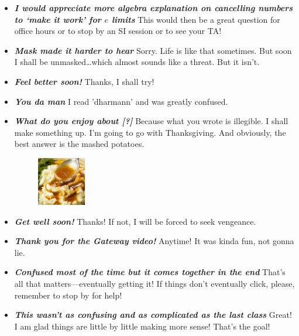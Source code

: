 \documentclass[11pt,letterpaper]{article}
\begin{document}
\begin{itemize}
\item {\bfseries\itshape I would appreciate more algebra explanation on cancelling numbers to `make it work' for $e$ limits} This would then be a great question for office hours or to stop by an SI session or to see your TA! 

\item {\bfseries\itshape Mask made it harder to hear} Sorry. Life is like that sometimes. But soon I shall be unmasked\dots which almost sounds like a threat. But it isn't. 

\item {\bfseries\itshape Feel better soon!} Thanks, I shall try!

\item {\bfseries\itshape You da man} I read 'dharmann' and was greatly confused. 

\item {\bfseries\itshape What do you enjoy about [?]} Because what you wrote is illegible. I shall make something up. I'm going to go with Thanksgiving. And obviously, the best answer is the mashed potatoes. 
	\begin{figure}[H]
	\centering
	\includegraphics[width=0.2\textwidth]{images/potato.jpg}
	\end{figure}

\item {\bfseries\itshape Get well soon!} Thanks! If not, I will be forced to seek vengeance. 

\item {\bfseries\itshape Thank you for the Gateway video!} Anytime! It was kinda fun, not gonna lie.

\item {\bfseries\itshape Confused most of the time but it comes together in the end} That's all that matters---eventually getting it! If things don't eventually click, please, remember to stop by for help!

\item {\bfseries\itshape This wasn't as confusing and as complicated as the last class} Great! I am glad things are little by little making more sense! That's the goal!


\end{itemize}
\end{document}
